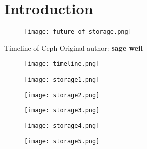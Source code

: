 
\section{Introduction}

\begin{frame}{}
    \begin{figure}[htpb]
        \centering
        \texttt{[image: future-of-storage.png]}
    \end{figure}
\end{frame}

\begin{frame}{Timeline of Ceph}
    Original author: \textbf{sage weil}
    \begin{figure}[htpb]
        \centering
        \texttt{[image: timeline.png]}
    \end{figure}
\end{frame}

\begin{frame}{}
    \begin{figure}[htpb]
        \centering
        \texttt{[image: storage1.png]}
    \end{figure}
\end{frame}

\begin{frame}{}
    \begin{figure}[htpb]
        \centering
        \texttt{[image: storage2.png]}
    \end{figure}
\end{frame}

\begin{frame}{}
    \begin{figure}[htpb]
        \centering
        \texttt{[image: storage3.png]}
    \end{figure}
\end{frame}

\begin{frame}{}
    \begin{figure}[htpb]
        \centering
        \texttt{[image: storage4.png]}
    \end{figure}
\end{frame}

\begin{frame}{}
    \begin{figure}[htpb]
        \centering
        \texttt{[image: storage5.png]}
    \end{figure}
\end{frame}

